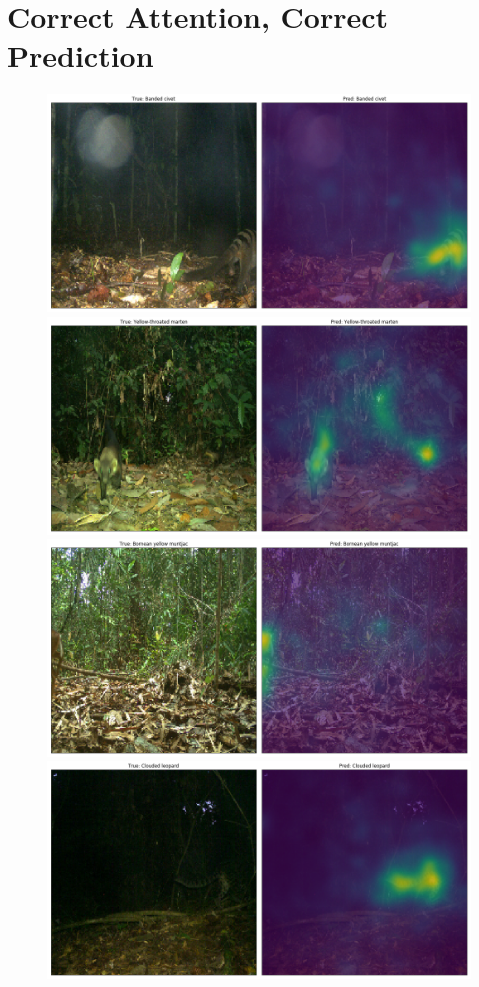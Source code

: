 \documentclass[journal, a4paper]{IEEEtran}
\begin{document}
\section{Correct Attention, Correct Prediction}
	\begin{figure}[!hbt]
		\begin{center}
		\includegraphics[width=\columnwidth]{images/good_civet.png}
		\includegraphics[width=\columnwidth]{images/Attention_right_dual.png}
		\includegraphics[width=\columnwidth]{images/Attention_right4.png}
		\includegraphics[width=\columnwidth]{images/Attention_right5.png}

\end{center}
\end{figure}
\end{document}
